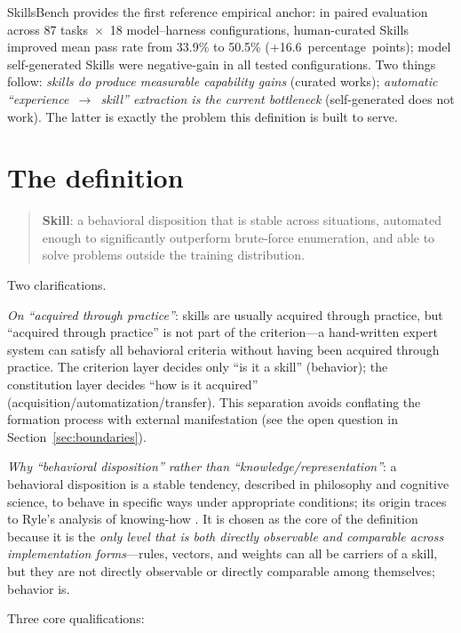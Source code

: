 \documentclass[11pt]{article}
\begin{document}
SkillsBench \cite{skillsbench} provides the first reference empirical anchor: in paired evaluation across 87 tasks~$\times$~18 model--harness configurations, human-curated Skills improved mean pass rate from 33.9\% to 50.5\% (+16.6~percentage~points); model self-generated Skills were negative-gain in all tested configurations. Two things follow: \emph{skills do produce measurable capability gains} (curated works); \emph{automatic ``experience~$\rightarrow$~skill'' extraction is the current bottleneck} (self-generated does not work). The latter is exactly the problem this definition is built to serve.

\section{The definition}
\label{sec:definition}

\begin{quote}
\textbf{Skill}: a behavioral disposition that is stable across situations, automated enough to significantly outperform brute-force enumeration, and able to solve problems outside the training distribution.
\end{quote}

Two clarifications.

\emph{On ``acquired through practice''}: skills are usually acquired through practice, but ``acquired through practice'' is not part of the criterion---a hand-written expert system can satisfy all behavioral criteria without having been acquired through practice. The criterion layer decides only ``is it a skill'' (behavior); the constitution layer decides ``how is it acquired'' (acquisition/automatization/transfer). This separation avoids conflating the formation process with external manifestation (see the open question in Section~\ref{sec:boundaries}).

\emph{Why ``behavioral disposition'' rather than ``knowledge/representation''}: a behavioral disposition is a stable tendency, described in philosophy and cognitive science, to behave in specific ways under appropriate conditions; its origin traces to Ryle's analysis of knowing-how \cite{ryle1949}. It is chosen as the core of the definition because it is the \emph{only level that is both directly observable and comparable across implementation forms}---rules, vectors, and weights can all be carriers of a skill, but they are not directly observable or directly comparable among themselves; behavior is.

Three core qualifications:
\end{document}
